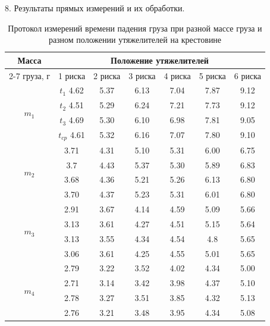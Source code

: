 \documentclass[12pt]{article}
\begin{document}
\begin{flushleft}
    8. Результаты прямых измерений и их обработки. \\
\end{flushleft}
\begin{table}[h]
    \centering
    \renewcommand{\arraystretch}{1.3}
    \setlength{\tabcolsep}{8pt}
    \captionsetup{justification=centering, font=bf}
    \caption{Протокол измерений времени падения груза при разной массе груза и разном положении утяжелителей на крестовине}
    \begin{tabular}{|c|c|c|c|c|c|c|}
        \hline
        Масса & \multicolumn{6}{c|}{Положение утяжелителей} \\
        \cline{2-7}
        груза, г & 1 риска & 2 риска & 3 риска & 4 риска & 5 риска & 6 риска \\
        \hline
        \multirow{4}{*}{$m_1$} & $t_1$ 4.62 & 5.37 & 6.13 & 7.04 & 7.87 & 9.12 \\
        \cline{2-7}
        & $t_2$ 4.51 & 5.29 & 6.24 & 7.21 & 7.73 & 9.12 \\
        \cline{2-7}
        & $t_3$ 4.69 & 5.30 & 6.10 & 6.98 & 7.81 & 9.05 \\
        \cline{2-7}
        & $t_{cp}$ 4.61 & 5.32 & 6.16 & 7.07 & 7.80 & 9.10 \\
        \hline
        \multirow{4}{*}{$m_2$} & 3.71 & 4.31 & 5.10 & 5.31 & 6.00 & 6.75 \\
        \cline{2-7}
        & 3.7 & 4.43 & 5.37 & 5.30 & 5.89 & 6.83 \\
        \cline{2-7}
        & 3.68 & 4.36 & 5.21 & 5.26 & 6.13 & 6.80 \\
        \cline{2-7}
        & 3.70 & 4.37 & 5.23 & 5.31 & 6.01 & 6.80 \\
        \hline
        \multirow{4}{*}{$m_3$} & 2.91 & 3.67 & 4.14 & 4.59 & 5.09 & 5.66 \\
        \cline{2-7}
        & 3.13 & 3.61 & 4.27 & 4.51 & 5.15 & 5.64 \\
        \cline{2-7}
        & 3.13 & 3.55 & 4.34 & 4.54 & 4.8 & 5.65 \\
        \cline{2-7}
        & 3.06 & 3.61 & 4.25 & 4.55 & 5.01 & 5.65 \\
        \hline
        \multirow{4}{*}{$m_4$} & 2.79 & 3.22 & 3.52 & 4.02 & 4.34 & 5.00 \\
        \cline{2-7}
        & 2.71 & 3.14 & 3.42 & 3.98 & 4.37 & 5.10 \\
        \cline{2-7}
        & 2.78 & 3.27 & 3.51 & 3.85 & 4.32 & 5.13 \\
        \cline{2-7}
        & 2.76 & 3.21 & 3.48 & 3.95 & 4.34 & 5.08 \\
        \hline
    \end{tabular}
\end{table}
\end{document}
